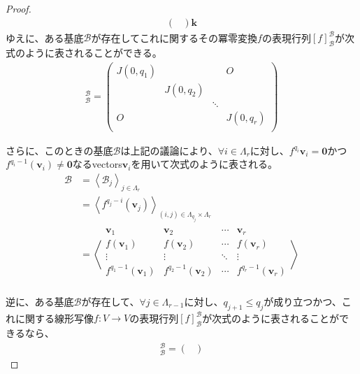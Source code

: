 \documentclass[dvipdfmx]{jsarticle}
\begin{document}
\begin{proof}
\begin{align*}
\begin{pmatrix}
\end{pmatrix}\mathbf{k}
\end{align*}
ゆえに、ある基底$\mathcal{B}$が存在してこれに関するその冪零変換$f$の表現行列$[ f]_{\mathcal{B}}^{\mathcal{B}}$が次式のように表されることができる。
\begin{align*}
[ f]_{\mathcal{B}}^{\mathcal{B}} = \begin{pmatrix}
J\left( 0,q_{1} \right) & \  & \  & O \\
\  & J\left( 0,q_{2} \right) & \  & \  \\
\  & \  & \ddots & \  \\
O & \  & \  & J\left( 0,q_{r} \right) \\
\end{pmatrix}
\end{align*}\par
さらに、このときの基底$\mathcal{B}$は上記の議論により、$\forall i \in \varLambda_{r}$に対し、$f^{q_{i}}\mathbf{v}_{i} = \mathbf{0}$かつ$f^{q_{i} - 1}\left( \mathbf{v}_{i} \right) \neq \mathbf{0}$なるvectors$\mathbf{v}_{i}$を用いて次式のように表される。
\begin{align*}
\mathcal{B} &= \left\langle \mathcal{B}_{j} \right\rangle_{j \in \varLambda_{r}}\\
&= \left\langle f^{q_{j} - i}\left( \mathbf{v}_{j} \right) \right\rangle_{(i,j) \in \varLambda_{q_{j}} \times \varLambda_{r}}\\
&= \left\langle \begin{matrix}
\mathbf{v}_{1} & \mathbf{v}_{2} & \cdots & \mathbf{v}_{r} \\
f\left( \mathbf{v}_{1} \right) & f\left( \mathbf{v}_{2} \right) & \cdots & f\left( \mathbf{v}_{r} \right) \\
 \vdots & \vdots & \ddots & \vdots \\
f^{q_{1} - 1}\left( \mathbf{v}_{1} \right) & f^{q_{2} - 1}\left( \mathbf{v}_{2} \right) & \cdots & f^{q_{r} - 1}\left( \mathbf{v}_{r} \right) \\
\end{matrix} \right\rangle
\end{align*}\par
逆に、ある基底$\mathcal{B}$が存在して、$\forall j \in \varLambda_{r - 1}$に対し、$q_{j + 1} \leq q_{j}$が成り立つかつ、これに関する線形写像$f:V \rightarrow V$の表現行列$[ f]_{\mathcal{B}}^{\mathcal{B}}$が次式のように表されることができるなら、
\begin{align*}
[ f]_{\mathcal{B}}^{\mathcal{B}} = \begin{pmatrix}

\end{pmatrix}
\end{align*}
\end{proof}
\end{document}
